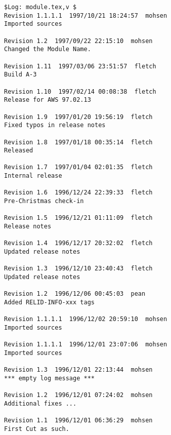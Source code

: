 \begin{verbatim}
$Log: module.tex,v $
Revision 1.1.1.1  1997/10/21 18:24:57  mohsen
Imported sources

Revision 1.2  1997/09/22 22:15:10  mohsen
Changed the Module Name.

Revision 1.11  1997/03/06 23:51:57  fletch
Build A-3

Revision 1.10  1997/02/14 00:08:38  fletch
Release for AWS 97.02.13

Revision 1.9  1997/01/20 19:56:19  fletch
Fixed typos in release notes

Revision 1.8  1997/01/18 00:35:14  fletch
Released

Revision 1.7  1997/01/04 02:01:35  fletch
Internal release

Revision 1.6  1996/12/24 22:39:33  fletch
Pre-Christmas check-in

Revision 1.5  1996/12/21 01:11:09  fletch
Release notes

Revision 1.4  1996/12/17 20:32:02  fletch
Updated release notes

Revision 1.3  1996/12/10 23:40:43  fletch
Updated release notes

Revision 1.2  1996/12/06 00:45:03  pean
Added RELID-INFO-xxx tags

Revision 1.1.1.1  1996/12/02 20:59:10  mohsen
Imported sources

Revision 1.1.1.1  1996/12/01 23:07:06  mohsen
Imported sources

Revision 1.3  1996/12/01 22:13:44  mohsen
*** empty log message ***

Revision 1.2  1996/12/01 07:24:02  mohsen
Additional fixes ...

Revision 1.1  1996/12/01 06:36:29  mohsen
First Cut as such.


\end{verbatim}



